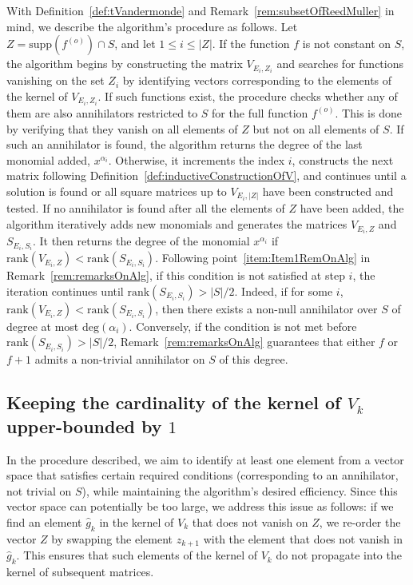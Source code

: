\documentclass[11pt]{llncs}
\begin{document}
With Definition~\ref{def:tVandermonde} and Remark~\ref{rem:subsetOfReedMuller} in mind, we describe the algorithm's procedure as follows. 
Let \( Z = \text{supp}\left(f^{(o)}\right) \cap S \), and let \( 1 \leq i \leq |Z| \). If the function \( f \) is not constant on \( S \), the algorithm begins by constructing the matrix \( V_{E_i, Z_i} \) and searches for functions vanishing on the set \( Z_i \) by identifying vectors corresponding to the elements of the kernel of \( V_{E_i, Z_i} \).
If such functions exist, the procedure checks whether any of them are also annihilators restricted to \( S \) for the full function \( f^{(o)} \). This is done by verifying that they vanish on all elements of \( Z \) but not on all elements of \( S \). If such an annihilator is found, the algorithm returns the degree of the last monomial added, \( x^{\alpha_i} \). Otherwise, it increments the index \( i \), constructs the next matrix following Definition~\ref{def:inductiveConstructionOfV}, and continues until a solution is found or all square matrices up to \( V_{E_i, |Z|} \) have been constructed and tested.
If no annihilator is found after all the elements of \( Z \) have been added, the algorithm iteratively adds new monomials and generates the matrices \( V_{E_i, Z} \) and \( S_{E_i, S_i} \). It then returns the degree of the monomial \( x^{\alpha_i} \) if \( \text{rank}\left(V_{E_i, Z}\right) < \text{rank}\left(S_{E_i, S_i}\right) \). Following point~\ref{item:Item1RemOnAlg} in Remark~\ref{rem:remarksOnAlg}, if this condition is not satisfied at step \( i \), the iteration continues until \( \text{rank}\left(S_{E_i, S_i}\right) > |S| / 2 \).
Indeed, if for some \( i \), \( \text{rank}\left(V_{E_i, Z}\right) < \text{rank}\left(S_{E_i, S_i}\right) \), then there exists a non-null annihilator over \( S \) of degree at most \( \text{deg}(\alpha_i) \). Conversely, if the condition is not met before \( \text{rank}\left(S_{E_i, S_i}\right) > |S| / 2 \), Remark~\ref{rem:remarksOnAlg} guarantees that either \( f \) or \( f+1 \) admits a non-trivial annihilator on \( S \) of this degree.



\subsection{Keeping the cardinality of the kernel of $V_k$ upper-bounded by $1$}

In the procedure described, we aim to identify at least one element from a vector space that satisfies certain required conditions (corresponding to an annihilator, not trivial on $S$), while maintaining the algorithm's desired efficiency. 
Since this vector space can potentially be too large, we address this issue as follows: if we find an element \( \hat{g}_k \) in the kernel of \( V_k \) that does not vanish on \( Z \), we re-order the vector \( Z \) by swapping the element \( z_{k+1} \) with the element that does not vanish in \( \hat{g}_k \). 
This ensures that such elements of the kernel of \( V_k \) do not propagate into the kernel of subsequent matrices.
\end{document}
